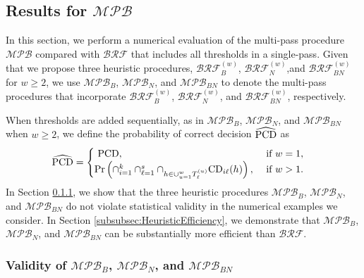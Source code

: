 \documentclass[11pt]{article}
\begin{document}
\subsection{Results for $\mathcal{MPB}$} 
\label{subsec:MBeRFExp}

In this section, we perform a numerical evaluation of the multi-pass procedure $\mathcal{MPB}$ compared with $\mathcal{BRF}$ that includes all thresholds in a single-pass.
Given that we propose three heuristic procedures, $\mathcal{BRF}_B^{(w)}$, $\mathcal{BRF}_N^{(w)}$,and $\mathcal{BRF}_{BN}^{(w)}$ for $w\geq 2$, we use $\mathcal{MPB}_B$, $\mathcal{MPB}_N$, and $\mathcal{MPB}_{BN}$ to denote the multi-pass procedures that incorporate $\mathcal{BRF}_B^{(w)}$, $\mathcal{BRF}_N^{(w)}$, and $\mathcal{BRF}_{BN}^{(w)}$, respectively. 

When thresholds are added sequentially, as in $\mathcal{MPB}_B$, $\mathcal{MPB}_N$, and $\mathcal{MPB}_{BN}$ when $w\geq 2$, we define the probability of correct decision $\widehat{{\rm PCD}}$ as 
\begin{align*}
    \widehat{{\rm PCD}} &= 
    \begin{cases}
        \ {\rm PCD}, & \text{ if } w= 1, \\
        \Pr \left( \cap_{i=1}^k \cap_{\ell=1}^s \cap_{h\in \cup_{u=1}^w T_\ell^{(u)} } {\rm CD}_{i\ell} (h) \right), & \text{ if } w>1.
    \end{cases}
\end{align*}
In Section \ref{subsubsec:HeuristicValidity}, we show that the three heuristic procedures $\mathcal{MPB}_B$, $\mathcal{MPB}_N$, and $\mathcal{MPB}_{BN}$ do not violate statistical validity in the numerical examples we consider. In Section \ref{subsubsec:HeuristicEfficiency}, we demonstrate that $\mathcal{MPB}_B$, $\mathcal{MPB}_N$, and $\mathcal{MPB}_{BN}$ can be substantially more efficient than $\mathcal{BRF}$.

\subsubsection{Validity of $\mathcal{MPB}_B$, $\mathcal{MPB}_N$, and $\mathcal{MPB}_{BN}$}
\label{subsubsec:HeuristicValidity}
\end{document}
